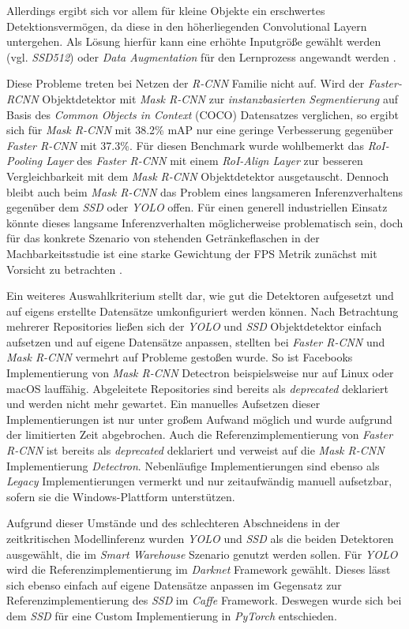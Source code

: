 Allerdings ergibt sich vor allem für kleine Objekte ein erschwertes Detektionsvermögen, da diese in den höherliegenden Convolutional Layern untergehen. Als Lösung hierfür kann eine erhöhte Inputgröße gewählt werden (vgl. \textit{SSD512}) oder \textit{Data Augmentation} für den Lernprozess angewandt werden \cite{ssd.20161229}.

Diese Probleme treten bei Netzen der \textit{R-CNN} Familie nicht auf. Wird der \textit{Faster-RCNN} Objektdetektor mit \textit{Mask R-CNN} zur \textit{instanzbasierten Segmentierung} auf Basis des \textit{Common Objects in Context} (COCO) Datensatzes verglichen, so ergibt sich für \textit{Mask R-CNN} mit 38.2\% mAP nur eine geringe Verbesserung gegenüber \textit{Faster R-CNN} mit 37.3\%. Für diesen Benchmark wurde wohlbemerkt das \textit{RoI-Pooling Layer} des \textit{Faster R-CNN} mit einem \textit{RoI-Align Layer} zur besseren Vergleichbarkeit mit dem \textit{Mask R-CNN} Objektdetektor ausgetauscht. Dennoch bleibt auch beim \textit{Mask R-CNN} das Problem eines langsameren Inferenzverhaltens gegenüber dem \textit{SSD} oder \textit{YOLO} offen. Für einen generell industriellen Einsatz könnte dieses langsame Inferenzverhalten möglicherweise problematisch sein, doch für das konkrete Szenario von stehenden Getränkeflaschen in der Machbarkeitsstudie ist eine starke Gewichtung der FPS Metrik zunächst mit Vorsicht zu betrachten \cite{IntanPurnamasar.20181215}. 

Ein weiteres Auswahlkriterium stellt dar, wie gut die Detektoren aufgesetzt und auf eigens erstellte Datensätze umkonfiguriert werden können. Nach Betrachtung mehrerer Repositories ließen sich der \textit{YOLO} und \textit{SSD} Objektdetektor einfach aufsetzen und auf eigene Datensätze anpassen, stellten bei \textit{Faster R-CNN} und \textit{Mask R-CNN} vermehrt auf Probleme gestoßen wurde. So ist Facebooks Implementierung von \textit{Mask R-CNN} \glqq Detectron\grqq{} beispielsweise nur auf Linux oder macOS lauffähig. Abgeleitete Repositories sind bereits als \textit{deprecated} deklariert und werden nicht mehr gewartet. Ein manuelles Aufsetzen dieser Implementierungen ist nur unter großem Aufwand möglich und wurde aufgrund der limitierten Zeit abgebrochen. Auch die Referenzimplementierung von \textit{Faster R-CNN} ist bereits als \textit{deprecated} deklariert und verweist auf die \textit{Mask R-CNN} Implementierung \textit{Detectron}. Nebenläufige Implementierungen sind ebenso als \textit{Legacy} Implementierungen vermerkt und nur zeitaufwändig manuell aufsetzbar, sofern sie die Windows-Plattform unterstützen.

Aufgrund dieser Umstände und des schlechteren Abschneidens in der zeitkritischen Modellinferenz wurden \textit{YOLO} und \textit{SSD} als die beiden Detektoren ausgewählt, die im \textit{Smart Warehouse} Szenario genutzt werden sollen. Für \textit{YOLO} wird die Referenzimplementierung im \textit{Darknet} Framework gewählt. Dieses lässt sich ebenso einfach auf eigene Datensätze anpassen im Gegensatz zur Referenzimplementierung des \textit{SSD} im \textit{Caffe} Framework. Deswegen wurde sich bei dem \textit{SSD} für eine Custom Implementierung in \textit{PyTorch} entschieden.






